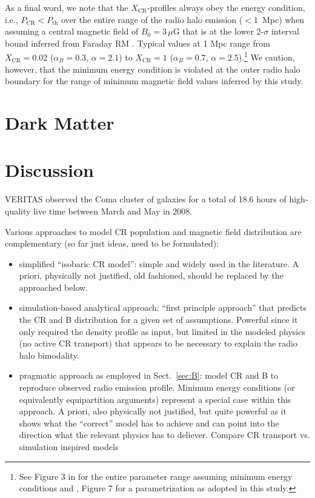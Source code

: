 \documentclass[12pt,manuscript]{aastex}
\newcommand{\CR}{\mathrm{CR}}
\begin{document}
As a final word, we note that the $X_\CR$-profiles always obey the energy
condition, i.e., $P_\CR < P_\mathrm{th}$ over the entire range of the radio halo
emission ($< 1$~Mpc) when assuming a central magnetic field of $B_0=3\,\mu$G
that is at the lower 2-$\sigma$ interval bound inferred from Faraday RM
\citep{2010A&A...513A..30B}. Typical values at 1 Mpc range from $X_\CR = 0.02$
($\alpha_B=0.3$, $\alpha=2.1$) to $X_\CR = 1$ ($\alpha_B=0.7$,
$\alpha=2.5$).\footnote{See Figure 3 in \citet{2004MNRAS.352...76P} for the
  entire parameter range assuming minimum energy conditions and
  \citet{2004A&A...413...17P}, Figure 7 for a parametrization as adopted in this
  study.} We caution, however, that the minimum energy condition is violated at
the outer radio halo boundary for the range of minimum magnetic field values
inferred by this study.




\section{Dark Matter}

\section{Discussion}
VERITAS observed the Coma cluster of galaxies for a total of 18.6 hours of high-quality live time between March and May in 2008. 


Various approaches to model CR population and magnetic field distribution are
complementary (so far just ideas, need to be formulated):
\begin{itemize}
\item simplified ``isobaric CR model'': simple and widely used in the
  literature. A priori, physically not justified, old fashioned, should be
  replaced by the approached below.
\item simulation-based analytical approach: ``first principle approach'' that
  predicts the CR and B distribution for a given set of assumptions. Powerful
  since it only required the density profile as input, but limited in the
  modeled physics (no active CR transport) that appears to be necessary to
  explain the radio halo bimodality.
\item pragmatic approach as employed in Sect.~\ref{sec:B}: model CR and B to
  reproduce observed radio emission profile. Minimum energy conditions (or
  equivalently equipartition arguments) represent a special case within this
  approach. A priori, also physically not justified, but quite powerful as it
  shows what the ``correct'' model has to achieve and can point into the
  direction what the relevant physics has to deliever. Compare CR transport
  vs. simulation inspired models
\end{itemize}
\end{document}

